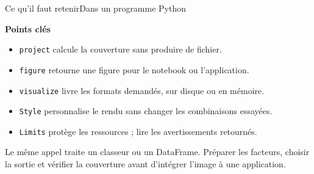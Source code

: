 \begin{frame}[t]{Ce qu'il faut retenir}{Dans un programme Python}
\vfill
{
\begin{mybox3}{\textbf{Points clés}}
\begin{itemize}\itemsep5pt
\item \texttt{project} calcule la couverture sans produire de fichier.
\item \texttt{figure} retourne une figure pour le notebook ou l'application.
\item \texttt{visualize} livre les formats demandés, sur disque ou en mémoire.
\item \texttt{Style} personnalise le rendu sans changer les combinaisons essayées.
\item \texttt{Limits} protège les ressources ; lire les avertissements retournés.
\end{itemize}
\end{mybox3}
Le même appel traite un classeur ou un DataFrame. Préparer les facteurs, choisir la sortie et vérifier la couverture avant d'intégrer l'image à une application.}
\vfill
\end{frame}
